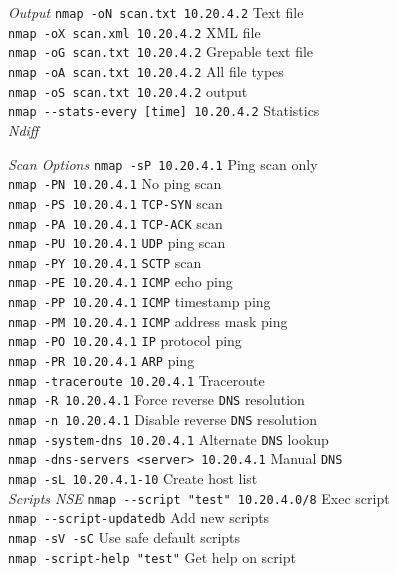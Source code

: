 \documentclass[a4paper,10pt]{article}
\begin{document}
\begin{multicols}{3}
\textit{Output}
\vskip-5pt
\verb|nmap -oN scan.txt 10.20.4.2| \dotfill Text file\\
\verb|nmap -oX scan.xml 10.20.4.2| \dotfill XML file\\
\verb|nmap -oG scan.txt 10.20.4.2| \dotfill Grepable text file\\
\verb|nmap -oA scan.txt 10.20.4.2| \dotfill All file types\\
\verb|nmap -oS scan.txt 10.20.4.2|  output\\
\verb|nmap --stats-every [time] 10.20.4.2| \dotfill Statistics\\

\textit{Ndiff}

\textit{Scan Options}
\vskip-5pt
\verb|nmap -sP 10.20.4.1| \dotfill Ping scan only\\
\verb|nmap -PN 10.20.4.1| \dotfill No ping scan\\
\verb|nmap -PS 10.20.4.1| \dotfill \verb|TCP-SYN| scan\\
\verb|nmap -PA 10.20.4.1| \dotfill \verb|TCP-ACK| scan\\
\verb|nmap -PU 10.20.4.1| \dotfill \verb|UDP| ping scan\\
\verb|nmap -PY 10.20.4.1| \dotfill \verb|SCTP| scan\\
\verb|nmap -PE 10.20.4.1| \dotfill \verb|ICMP| echo ping\\
\verb|nmap -PP 10.20.4.1| \dotfill \verb|ICMP| timestamp ping\\
\verb|nmap -PM 10.20.4.1| \dotfill \verb|ICMP| address mask ping\\
\verb|nmap -PO 10.20.4.1| \dotfill \verb|IP| protocol ping\\
\verb|nmap -PR 10.20.4.1| \dotfill \verb|ARP| ping\\
\verb|nmap -traceroute 10.20.4.1| \dotfill Traceroute\\
\verb|nmap -R 10.20.4.1| \dotfill Force reverse \verb|DNS| resolution\\
\verb|nmap -n 10.20.4.1| \dotfill Disable reverse \verb|DNS| resolution\\
\verb|nmap -system-dns 10.20.4.1| \dotfill Alternate \verb|DNS| lookup\\
\verb|nmap -dns-servers <server> 10.20.4.1| \dotfill Manual \verb|DNS|\\
\verb|nmap -sL 10.20.4.1-10| \dotfill Create host list\\

\textit{Scripts NSE}
\vskip-5pt
\verb|nmap --script "test" 10.20.4.0/8| \dotfill Exec script\\
\verb|nmap --script-updatedb| \dotfill Add new scripts\\
\verb|nmap -sV -sC| \dotfill Use safe default scripts\\
\verb|nmap -script-help "test"| \dotfill Get help on script\\


\end{multicols}
\end{document}
